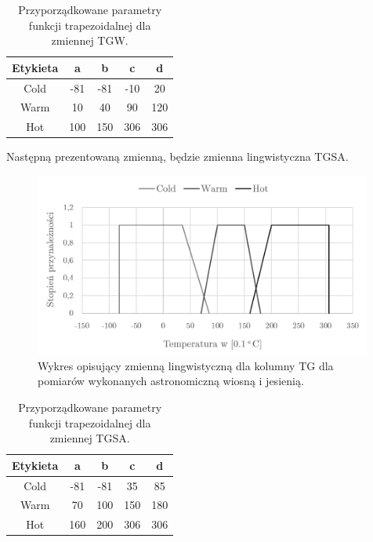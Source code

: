 \documentclass{classrep}
\begin{document}
\begin{table}[H]
	\centering
	\begin{tabular}{c c c c c} 
		\hline
		\textbf{Etykieta} & \textbf{a} & \textbf{b} & \textbf{c} & \textbf{d}\\ [0.5ex] 
		\hline
		\hline 
Cold	 &-81 & -81 & -10 & 20 \\
Warm & 10 & 40 & 90 & 120 \\
Hot	 & 100 & 150 & 306 & 306 \\
		\hline
	\end{tabular}
	\caption{Przyporządkowane parametry funkcji trapezoidalnej dla zmiennej TGW.}
\end{table}



Następną prezentowaną zmienną, będzie zmienna lingwistyczna TGSA.
\begin{figure}[H]
	\centering
	\includegraphics[width=0.99\textwidth]{Pictures/TermsCharts/TG_WJ.png}
	\caption{Wykres opisujący zmienną lingwistyczną dla kolumny TG dla pomiarów wykonanych astronomiczną wiosną i jesienią.}
\end{figure}

\begin{table}[H]
	\centering
	\begin{tabular}{c c c c c} 
		\hline
		\textbf{Etykieta} & \textbf{a} & \textbf{b} & \textbf{c} & \textbf{d}\\ [0.5ex] 
		\hline
		\hline 
Cold	 &-81 & -81 & 35 & 85 \\
Warm & 70 & 100 & 150 & 180 \\
Hot	 & 160 & 200 & 306 & 306 \\
		\hline
	\end{tabular}
	\caption{Przyporządkowane parametry funkcji trapezoidalnej dla zmiennej TGSA.}
\end{table}
\end{document}
